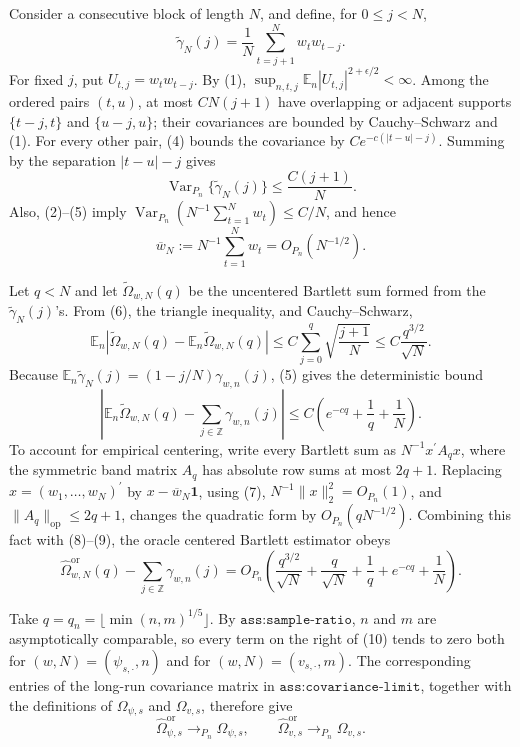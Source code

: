 Consider a consecutive block of length \(N\), and define, for \(0\leq j<N\),
\[
 \widetilde\gamma_N(j)=\frac1N\sum_{t=j+1}^{N}w_tw_{t-j}.
\]
For fixed \(j\), put \(U_{t,j}=w_tw_{t-j}\).  By (1), \(\sup_{n,t,j}\mathbb E_n|U_{t,j}|^{2+\epsilon/2}<\infty\).  Among the ordered pairs \((t,u)\), at most \(C N(j+1)\) have overlapping or adjacent supports \(\{t-j,t\}\) and \(\{u-j,u\}\); their covariances are bounded by Cauchy--Schwarz and (1).  For every other pair, (4) bounds the covariance by \(Ce^{-c(|t-u|-j)}\).  Summing by the separation \(|t-u|-j\) gives
\[
 \operatorname{Var}_{P_n}\{\widetilde\gamma_N(j)\}
 \leq \frac{C(j+1)}{N}.                                                             \tag{6}
\]
Also, (2)--(5) imply \(\operatorname{Var}_{P_n}(N^{-1}\sum_{t=1}^Nw_t)\leq C/N\), and hence
\[
 \overline w_N:=N^{-1}\sum_{t=1}^Nw_t=O_{P_n}(N^{-1/2}).                            \tag{7}
\]

Let \(q<N\) and let \(\widetilde\Omega_{w,N}(q)\) be the uncentered Bartlett sum formed from the \(\widetilde\gamma_N(j)\)'s.  From (6), the triangle inequality, and Cauchy--Schwarz,
\[
 \mathbb E_n\left|
 \widetilde\Omega_{w,N}(q)-\mathbb E_n\widetilde\Omega_{w,N}(q)
 \right|
 \leq C\sum_{j=0}^q\sqrt{\frac{j+1}{N}}
 \leq C\frac{q^{3/2}}{\sqrt N}.                                                     \tag{8}
\]
Because \(\mathbb E_n\widetilde\gamma_N(j)=(1-j/N)\gamma_{w,n}(j)\), (5) gives the deterministic bound
\[
 \left|
 \mathbb E_n\widetilde\Omega_{w,N}(q)
 -\sum_{j\in\mathbb Z}\gamma_{w,n}(j)
 \right|
 \leq C\left(e^{-cq}+\frac1q+\frac1N\right).                                      \tag{9}
\]
To account for empirical centering, write every Bartlett sum as \(N^{-1}x^{\prime}A_qx\), where the symmetric band matrix \(A_q\) has absolute row sums at most \(2q+1\).  Replacing \(x=(w_1,\ldots,w_N)^{\prime}\) by \(x-\overline w_N\mathbf 1\), using (7), \(N^{-1}\lVert x\rVert_2^2=O_{P_n}(1)\), and \(\lVert A_q\rVert_{\mathrm{op}}\leq2q+1\), changes the quadratic form by \(O_{P_n}(qN^{-1/2})\).  Combining this fact with (8)--(9), the oracle centered Bartlett estimator obeys
\[
 \widehat\Omega^{\mathrm{or}}_{w,N}(q)
 -\sum_{j\in\mathbb Z}\gamma_{w,n}(j)
 =O_{P_n}\left(
   \frac{q^{3/2}}{\sqrt N}+\frac q{\sqrt N}
   +\frac1q+e^{-cq}+\frac1N
 \right).                                                                           \tag{10}
\]

Take \(q=q_n=\lfloor\min(n,m)^{1/5}\rfloor\).  By \(\texttt{ass:sample-ratio}\), \(n\) and \(m\) are asymptotically comparable, so every term on the right of (10) tends to zero both for \((w,N)=(\psi_{s,\cdot},n)\) and for \((w,N)=(v_{s,\cdot},m)\).  The corresponding entries of the long-run covariance matrix in \(\texttt{ass:covariance-limit}\), together with the definitions of \(\Omega_{\psi,s}\) and \(\Omega_{v,s}\), therefore give
\[
 \widehat\Omega^{\mathrm{or}}_{\psi,s}\to_{P_n}\Omega_{\psi,s},
 \qquad
 \widehat\Omega^{\mathrm{or}}_{v,s}\to_{P_n}\Omega_{v,s}.                        \tag{11}
\]

